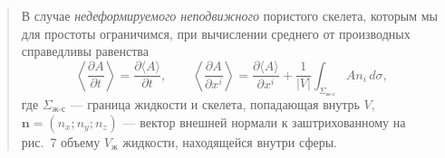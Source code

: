 \documentclass[12pt,a4paper]{article}
\newenvironment{textquote}{\begin{quote}\sloppy}{\end{quote}}
\begin{document}
\begin{textquote}
В случае \textit{недеформируемого неподвижного} пористого скелета, которым мы для простоты ограничимся, при вычислении среднего от производных справедливы равенства
\begin{equation}
\left\langle\frac{\partial A}{\partial t}\right\rangle=\frac{\partial\langle A\rangle}{\partial t},\qquad
\left\langle\frac{\partial A}{\partial x^i}\right\rangle=\frac{\partial\langle A\rangle}{\partial x^i}+\frac{1}{|V|}\int_{\Sigma_{\text{ж-с}}}An_i\,d\sigma,
\tag{5.1}\label{q3:eq-5-1}
\end{equation}
где $\Sigma_{\text{ж-с}}$ --- граница жидкости и скелета, попадающая внутрь $V$, $\boldsymbol{n}=(n_x;n_y;n_z)$ --- вектор внешней нормали к заштрихованному на рис.~7 объему $V_{\text{ж}}$ жидкости, находящейся внутри сферы.
\end{textquote}
\end{document}
